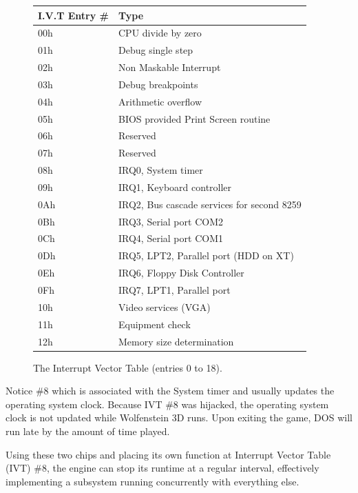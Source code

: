 \begin{figure}[H]
	\centering
	\begin{tabularx}{\textwidth}{ l p{}  }
	  \toprule
	  \textbf{I.V.T Entry \#} & \textbf{Type} \\ \bottomrule

	  00h	&	CPU divide by zero \\
01h	&	Debug single step \\
02h	&	Non Maskable Interrupt \\
03h	&	Debug breakpoints \\
04h	&	Arithmetic overflow \\
05h	&	BIOS provided Print Screen routine \\
06h	&	Reserved \\
07h	&	Reserved \\

		08h & IRQ0, System timer \\
		09h & IRQ1, Keyboard controller \\
		0Ah & IRQ2, Bus cascade services for second 8259 \\
		0Bh & IRQ3, Serial port COM2 \\ 
		0Ch & IRQ4, Serial port COM1 \\
		0Dh & IRQ5, LPT2, Parallel port (HDD on XT) \\
		0Eh & IRQ6, Floppy Disk Controller \\
		0Fh & IRQ7, LPT1, Parallel port \\
		10h & Video services (VGA)\\
		11h & Equipment check \\
		12h & Memory size determination \\
		\bottomrule
	\end{tabularx}
	\caption{The Interrupt Vector Table (entries 0 to 18).}
\end{figure}
Notice \#8 which is associated with the System timer and usually updates the operating system clock. Because IVT \#8 was hijacked, the operating system clock is not updated while Wolfenstein 3D runs. Upon exiting the game, DOS will run late by the amount of time played.\\
\par
Using these two chips and placing its own function at Interrupt Vector Table (IVT) \#8, the engine can stop its runtime at a regular interval, effectively implementing a subsystem running concurrently with everything else.\\
